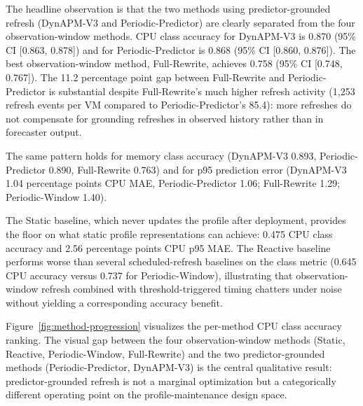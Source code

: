 \documentclass[manuscript,screen,review,anonymous]{acmart}
\begin{document}
\begin{table}
\centering
\caption{Per-method profile accuracy and refresh activity on the
full Materna corpus (1{,}576 VMs; six methods). Mean values are
reported with 95\% confidence intervals from 1{,}000-sample paired
bootstrap. Rows are ordered alphabetically by method identifier
(DynAPM-V3, Full-Rewrite, Periodic-Window, Periodic-Predictor,
Reactive, Static), not by accuracy.}
\label{tab:method-comparison}

\end{table}

The headline observation is that the two methods using
predictor-grounded refresh (DynAPM-V3 and Periodic-Predictor) are
clearly separated from the four observation-window methods. CPU
class accuracy for DynAPM-V3 is 0.870 (95\% CI [0.863, 0.878]) and
for Periodic-Predictor is 0.868 (95\% CI [0.860, 0.876]). The best
observation-window method, Full-Rewrite, achieves 0.758
(95\% CI [0.748, 0.767]). The 11.2 percentage point gap between
Full-Rewrite and Periodic-Predictor is substantial despite
Full-Rewrite's much higher refresh activity (1{,}253 refresh
events per VM compared to Periodic-Predictor's 85.4): more
refreshes do not compensate for grounding refreshes in observed
history rather than in forecaster output.

The same pattern holds for memory class accuracy (DynAPM-V3 0.893,
Periodic-Predictor 0.890, Full-Rewrite 0.763) and for p95
prediction error (DynAPM-V3 1.04 percentage points CPU MAE,
Periodic-Predictor 1.06; Full-Rewrite 1.29; Periodic-Window 1.40).

The Static baseline, which never updates the profile after
deployment, provides the floor on what static profile
representations can achieve: 0.475 CPU class accuracy and 2.56
percentage points CPU p95 MAE. The Reactive baseline performs
worse than several scheduled-refresh baselines on the class
metric (0.645 CPU accuracy versus 0.737 for Periodic-Window),
illustrating that observation-window refresh combined with
threshold-triggered timing chatters under noise without yielding
a corresponding accuracy benefit.

Figure~\ref{fig:method-progression} visualizes the per-method CPU
class accuracy ranking. The visual gap between the four
observation-window methods (Static, Reactive, Periodic-Window,
Full-Rewrite) and the two predictor-grounded methods
(Periodic-Predictor, DynAPM-V3) is the central qualitative
result: predictor-grounded refresh is not a marginal optimization
but a categorically different operating point on the
profile-maintenance design space.
\end{document}
